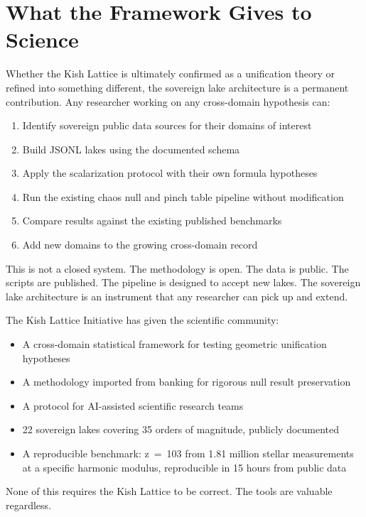 \documentclass[11pt, letterpaper, openany]{book}
\begin{document}
\section*{What the Framework Gives to Science}

Whether the Kish Lattice is ultimately confirmed as a unification theory or refined
into something different, the sovereign lake architecture is a permanent contribution.
Any researcher working on any cross-domain hypothesis can:

\begin{enumerate}
\item Identify sovereign public data sources for their domains of interest
\item Build JSONL lakes using the documented schema
\item Apply the scalarization protocol with their own formula hypotheses
\item Run the existing chaos null and pinch table pipeline without modification
\item Compare results against the existing published benchmarks
\item Add new domains to the growing cross-domain record
\end{enumerate}

This is not a closed system. The methodology is open. The data is public. The scripts
are published. The pipeline is designed to accept new lakes. The sovereign lake
architecture is an instrument that any researcher can pick up and extend.

The Kish Lattice Initiative has given the scientific community:

\begin{itemize}
\item A cross-domain statistical framework for testing geometric unification hypotheses
\item A methodology imported from banking for rigorous null result preservation
\item A protocol for AI-assisted scientific research teams
\item 22 sovereign lakes covering 35 orders of magnitude, publicly documented
\item A reproducible benchmark: z~=~103 from 1.81 million stellar measurements
  at a specific harmonic modulus, reproducible in 15 hours from public data
\end{itemize}

None of this requires the Kish Lattice to be correct. The tools are valuable regardless.
\end{document}
